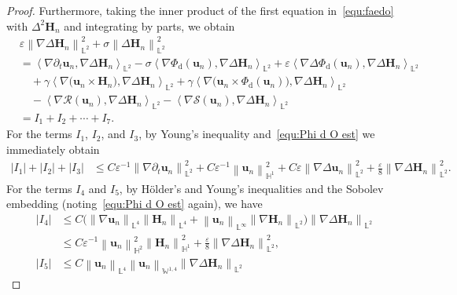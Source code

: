 \documentclass[11pt, reqno]{amsart}
\theoremstyle{definition}
\numberwithin{equation}{section}
\newcommand{\bff}{\boldsymbol}
\newcommand{\bb}{\mathbb}
\newcommand{\norm}[2]{\left\|{#1}\right\|_{#2}}
\newcommand{\inpro}[2]{\left\langle#1,#2\right\rangle}
\newcommand{\abs}[1]{\left|{#1}\right|}
\begin{document}
\begin{proof}
Furthermore, taking the inner product of the first equation in~\eqref{equ:faedo} with $\Delta^2 \bff{H}_n$ and integrating by parts, we obtain
\begin{align}\label{equ:nabdel Hn L2}
		\nonumber
		&\varepsilon \norm{\nabla \Delta \bff{H}_n}{\bb{L}^2}^2 
		+
		\sigma \norm{\Delta \bff{H}_n}{\bb{L}^2}^2
		\\
		&=
		\inpro{\nabla\partial_t \bff{u}_n}{\nabla\Delta \bff{H}_n}_{\bb{L}^2}
		-
		\sigma \inpro{\nabla\Phi_{\mathrm{d}}(\bff{u}_n)}{\nabla\Delta \bff{H}_n}_{\bb{L}^2}
		+
		\varepsilon \inpro{\nabla\Delta\Phi_{\mathrm{d}}(\bff{u}_n)}{\nabla\Delta \bff{H}_n}_{\bb{L}^2}
		\nonumber \\
		&\quad
		+
		\gamma \inpro{\nabla\big(\bff{u}_n\times \bff{H}_n\big)}{\nabla\Delta \bff{H}_n}_{\bb{L}^2}
		+
		\gamma \inpro{\nabla\big(\bff{u}_n\times \Phi_{\mathrm{d}}(\bff{u}_n)\big)}{\nabla\Delta \bff{H}_n}_{\bb{L}^2}
        \nonumber\\
        &\quad
		-
		\inpro{\nabla\mathcal{R}(\bff{u}_n)}{\nabla\Delta \bff{H}_n}_{\bb{L}^2}
		-
		\inpro{\nabla\mathcal{S}(\bff{u}_n)}{\nabla\Delta \bff{H}_n}_{\bb{L}^2}
		\nonumber \\
		&= I_1+I_2+\cdots+I_7.
	\end{align}
	For the terms $I_1$, $I_2$, and $I_3$, by Young's inequality and~\eqref{equ:Phi d O est} we immediately obtain
	\begin{align*}
		\abs{I_1}+\abs{I_2}+\abs{I_3}
		&\leq
		C\varepsilon^{-1} \norm{\nabla\partial_t \bff{u}_n}{\bb{L}^2}^2
		+
        C\varepsilon^{-1} \norm{\bff{u}_n}{\bb{H}^1}^2
        +
		C\varepsilon \norm{\nabla \Delta \bff{u}_n}{\bb{L}^2}^2
        +
		\frac{\varepsilon}{8} \norm{\nabla\Delta \bff{H}_n}{\bb{L}^2}^2.
	\end{align*}
	For the terms $I_4$ and $I_5$, by H\"older's and Young's inequalities  and the Sobolev embedding (noting~\eqref{equ:Phi d O est} again), we have
	\begin{align*}
		\abs{I_4}
		&\leq
		C \big(\norm{\nabla\bff{u}_n}{\bb{L}^4} \norm{\bff{H}_n}{\bb{L}^4}
        +
        \norm{\bff{u}_n}{\bb{L}^\infty} \norm{\nabla\bff{H}_n}{\bb{L}^2}\big)
		\norm{\nabla\Delta \bff{H}_n}{\bb{L}^2}
        \\
		&\leq
		C\varepsilon^{-1} \norm{\bff{u}_n}{\bb{H}^2}^2 \norm{\bff{H}_n}{\bb{H}^1}^2
		+
		\frac{\varepsilon}{8} \norm{\nabla\Delta \bff{H}_n}{\bb{L}^2}^2,
		\\
		\abs{I_5}
		&\leq
		C \norm{\bff{u}_n}{\bb{L}^4} \norm{\bff{u}_n}{\bb{W}^{1,4}}  \norm{\nabla\Delta \bff{H}_n}{\bb{L}^2}

\end{align*}
\end{proof}
\end{document}
